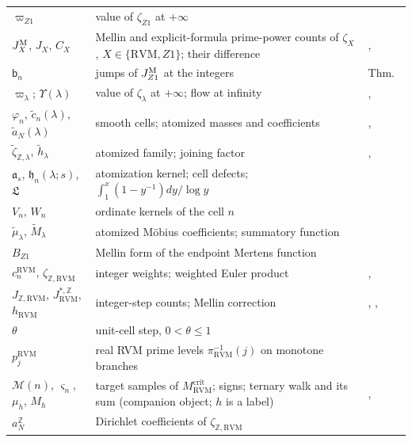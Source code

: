 \documentclass[11pt,reqno]{amsart}
\makeatletter
\let\CG@origref\ref
\let\CG@origeqref\eqref
\newcommand{\CG@gettip}[1]{\@ifundefined{CGTip@#1}{Reference: #1}{\csname CGTip@#1\endcsname}}
\DeclareRobustCommand{\CGref}[1]{\pdftooltip{\CG@origref{#1}}{\CG@gettip{#1}}}
\DeclareRobustCommand{\CGeqref}[1]{\pdftooltip{\CG@origeqref{#1}}{\CG@gettip{#1}}}
\numberwithin{equation}{section}
\theoremstyle{plain}
\theoremstyle{definition}
\theoremstyle{remark}
\newcommand{\Z}{\mathbb Z}
\newcommand{\RVM}{\mathrm{RVM}}
\newcommand{\crit}{\mathrm{crit}}
\makeatother
\begin{document}
{\begin{longtable}{>{\raggedright\arraybackslash}p{}>{\raggedright\arraybackslash}p{}>{\raggedright\arraybackslash}p{}}
$\varpi_{Z1}$ & value of $\zeta_{Z1}$ at $+\infty$ & \CGeqref{eq:varpi-Z1}\\
$J_X^{\rm M}$, $J_X$, $C_X$ & Mellin and explicit-formula prime-power counts of $\zeta_X$, $X\in\{\RVM,Z1\}$; their difference & \CGeqref{eq:mellin-count}, \CGeqref{eq:J-X}\\
$\mathsf b_n$ & jumps of $J_{Z1}^{\rm M}$ at the integers & Thm.~\CGref{thm:cell-form}\\
$\varpi_\lambda$; $\Upsilon(\lambda)$ & value of $\zeta_\lambda$ at $+\infty$; flow at infinity & \CGeqref{eq:varpi-lambda}, \CGeqref{eq:Upsilon}\\
$\varphi_n$, $\tilde c_n(\lambda)$, $\tilde a_N(\lambda)$ & smooth cells; atomized masses and coefficients & \CGeqref{eq:atomized-family}, \CGeqref{eq:atomized-coefficients}\\
$\tilde\zeta_{\Z,\lambda}$, $\tilde h_\lambda$ & atomized family; joining factor & \CGeqref{eq:atomized-family}, \CGeqref{eq:joining-factor}\\
$\mathfrak a_s$, $\mathfrak h_n(\lambda;s)$, $\mathfrak L$ & atomization kernel; cell defects; $\int_1^x(1-y^{-1})dy/\log y$ & \CGeqref{eq:atomization-kernel}\\
$V_n$, $W_n$ & ordinate kernels of the cell $n$ & \CGeqref{eq:VW}\\
$\tilde\mu_\lambda$, $\tilde M_\lambda$ & atomized M\"obius coefficients; summatory function & \CGeqref{eq:atomized-mobius}\\
$B_{Z1}$ & Mellin form of the endpoint Mertens function & \CGeqref{eq:Mellin-Mertens}\\
$c_n^{\RVM}$, $\zeta_{\Z,\RVM}$ & integer weights; weighted Euler product & \CGeqref{eq:cn}, \CGeqref{eq:weighted-zeta}\\
$J_{\Z,\RVM}$, $J_{\RVM}^{*,\Z}$, $h_{\RVM}$ & integer-step counts; Mellin correction & \CGeqref{eq:JZ}, \CGeqref{eq:J-star-Z}, \CGeqref{eq:hRVM}\\
$\theta$ & unit-cell step, $0<\theta\le1$ & \CGeqref{eq:unit-cell}\\
$p_j^{\RVM}$ & real RVM prime levels $\pi_{\RVM}^{-1}(j)$ on monotone branches & \CGeqref{eq:intro-real-primes}\\
$\mathcal M(n)$, $\varsigma_n$, $\mu_h$, $M_h$ & target samples of $M_{\RVM}^{\crit}$; signs; ternary walk and its sum (companion object; $h$ is a label) & \CGeqref{eq:intro-muh}, \CGeqref{eq:intro-quantizer}\\
$a_N^{\Z}$ & Dirichlet coefficients of $\zeta_{\Z,\RVM}$ & \CGeqref{eq:ZRVM-Dirichlet}\\

\end{longtable}}
\end{document}

